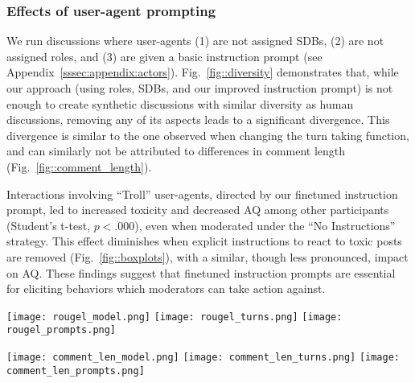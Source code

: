 \subsubsection{Effects of user-agent prompting}

We run discussions where user-agents (1) are not assigned \acp{SDB}, (2) are not assigned roles, and (3) are given a basic instruction prompt (see Appendix~\ref{sssec:appendix:actors}). Fig.~\ref{fig::diversity} demonstrates that, while our approach (using roles, \acp{SDB}, and our improved instruction prompt) is not enough to create synthetic discussions with similar diversity as human discussions, removing any of its aspects leads to a significant divergence. This divergence is similar to the one observed when changing the turn taking function, and can similarly not be attributed to differences in comment length (Fig.~\ref{fig::comment_length}).

Interactions involving “Troll” user-agents, directed by our finetuned instruction prompt, led to increased toxicity and decreased \ac{AQ} among other participants (Student's t-test, $p < .000$), even when moderated under the “No Instructions” strategy. This effect diminishes when explicit instructions to react to toxic posts are removed (Fig.~\ref{fig::boxplots}), with a similar, though less pronounced, impact on \ac{AQ}. These findings suggest that finetuned instruction prompts are essential for eliciting behaviors which moderators can take action against.

\begin{figure*}[t]
    \texttt{[image: rougel\_model.png]} \hfill
    \texttt{[image: rougel\_turns.png]}
    \hfill
    \texttt{[image: rougel\_prompts.png]}
	\centering
	\caption{Diversity (Section~\ref{ssec:methodology:diversity}) distribution for each discussion by model (Section~\ref{ssec:experimental:model}), turn-taking function $u$ (Section~\ref{ssec:experimental:turn}), and prompting function $\phi$ used (Section~\ref{ssec:experimental:prompts}).}
	\label{fig::diversity}
\end{figure*}

\begin{figure*}[t]
    \texttt{[image: comment\_len\_model.png]} \hfill
    \texttt{[image: comment\_len\_turns.png]}
    \hfill
    \texttt{[image: comment\_len\_prompts.png]}
	\centering
	\caption{Comment length for each discussion by model (Section~\ref{ssec:experimental:model}), turn-taking function $u$ (Section~\ref{ssec:experimental:turn}), and prompting function $\phi$ used (Section~\ref{ssec:experimental:prompts}). For ease of comparison, comments above $400$ words are marked at the end of the x-axis.}
	\label{fig::comment_length}
\end{figure*}

